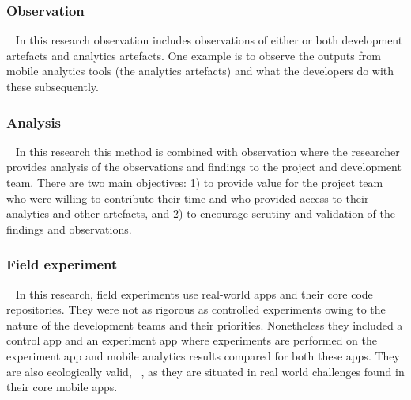 \subsubsection{Observation}~\label{section-observation-research-method}
In this research observation includes observations of either or both development artefacts and analytics artefacts. One example is to observe the outputs from mobile analytics tools (the analytics artefacts) and what the developers do with these subsequently. 

\subsubsection{Analysis}~\label{section-analysis-research-method}
In this research this method is combined with observation where the researcher provides analysis of the observations and findings to the project and development team. There are two main objectives: 1) to provide value for the project team who were willing to contribute their time and who provided access to their analytics and other artefacts, and 2) to encourage scrutiny and validation of the findings and observations.

\subsubsection{Field experiment}~\label{section-field-experiment-method}
In this research, field experiments use real-world apps and their core code repositories. They were not as rigorous as controlled experiments owing to the nature of the development teams and their priorities. Nonetheless they included a control app and an experiment app where experiments are performed on the experiment app and mobile analytics results compared for both these apps. They are also ecologically valid, ~\citep[p.126]{Ko2015_a_practical_guide_to_controlled_experiments_of_sw_eng_tools_with_human_participants}, as they are situated in real world challenges found in their core mobile apps.

